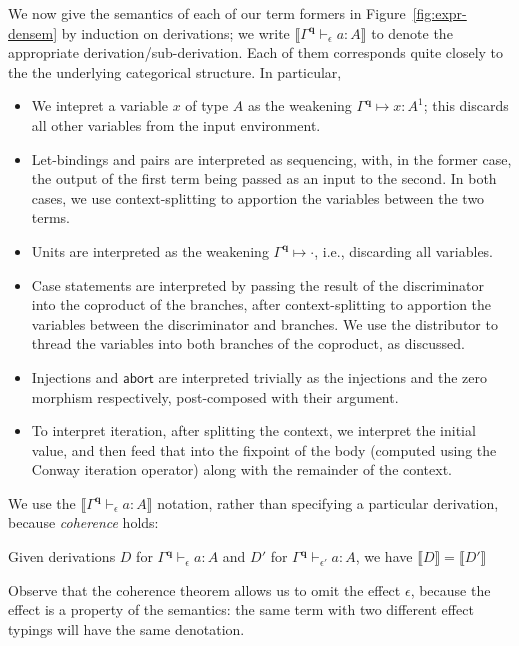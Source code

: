 \documentclass[acmsmall,screen,review]{acmart}
\newcommand{\mb}[1]{\ensuremath{\mathbf{#1}}}
\newcommand{\ms}[1]{\ensuremath{\mathsf{#1}}}
\newcommand{\cwk}[2]{#1 \mapsto #2}
\newcommand{\hasty}[4]{#1 \vdash_{#2} #3: {#4}}
\newcommand{\dnt}[1]{\llbracket{#1}\rrbracket}
\begin{document}
We now give the semantics of each of our term formers in Figure~\ref{fig:expr-densem} by induction
on derivations; we write $\dnt{\hasty{\Gamma^{\mb{q}}}{\epsilon}{a}{A}}$ to denote the appropriate
derivation/sub-derivation. Each of them corresponds quite closely to the the underlying categorical
structure. In particular,
\begin{itemize}
  \item We intepret a variable $x$ of type $A$ as the weakening $\cwk{\Gamma^{\mb{q}}}{x : A^1}$;
  this discards all other variables from the input environment.
  \item Let-bindings and pairs are interpreted as sequencing, with, in the former case, the output
  of the first term being passed as an input to the second. In both cases, we use context-splitting
  to apportion the variables between the two terms.
  \item Units are interpreted as the weakening $\cwk{\Gamma^{\mb{q}}}{\cdot}$, i.e., discarding all
  variables.
  \item Case statements are interpreted by passing the result of the discriminator into the
  coproduct of the branches, after context-splitting to apportion the variables between the
  discriminator and branches. We use the distributor to thread the variables into both branches of
  the coproduct, as discussed.
  \item Injections and $\ms{abort}$ are interpreted trivially as the injections and the zero
  morphism respectively, post-composed with their argument.
  \item To interpret iteration, after splitting the context, we interpret the initial value, and
  then feed that into the fixpoint of the body (computed using the Conway iteration operator) along
  with the remainder of the context.
\end{itemize}
We use the $\dnt{\hasty{\Gamma^{\mb{q}}}{\epsilon}{a}{A}}$ notation, rather than specifying a
particular derivation, because \emph{coherence} holds:
\begin{lemma}[Coherence]
  Given derivations $D$ for $\hasty{\Gamma^{\mb{q}}}{\epsilon}{a}{A}$ and $D'$ for
  $\hasty{\Gamma^{\mb{q}}}{\epsilon'}{a}{A}$, we have $\dnt{D} = \dnt{D'}$
\end{lemma}
Observe that the coherence theorem allows us to omit the effect $\epsilon$, because the effect is a
property of the semantics: the same term with two different effect typings will have the same
denotation.
\end{document}
